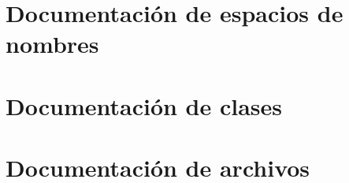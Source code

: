 \documentclass[twoside]{book}
\newcommand{\+}{\discretionary{\mbox{\scriptsize$\hookleftarrow$}}{}{}}
\newcommand{\clearemptydoublepage}{%
    \newpage{\pagestyle{empty}\cleardoublepage}%
  }
\begin{document}
\chapter{Documentación de espacios de nombres}

\chapter{Documentación de clases}





\chapter{Documentación de archivos}









































  \backmatter
  \newpage
  \clearemptydoublepage
  \printindex
\end{document}
